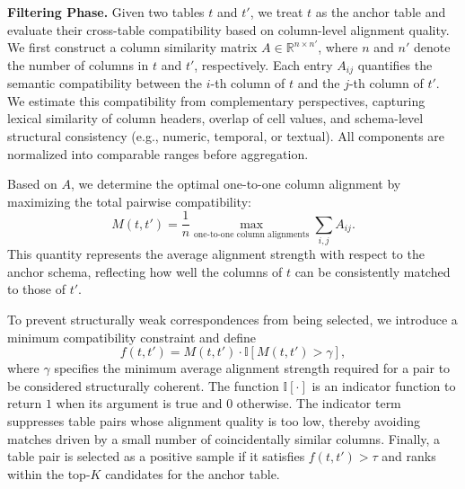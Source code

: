 \noindent\textbf{Filtering Phase.}
Given two tables $t$ and $t'$, we treat $t$ as the anchor table and evaluate their cross-table compatibility based on column-level alignment quality. 
We first construct a column similarity matrix $A\in\mathbb{R}^{n\times n'}$, where $n$ and $n'$ denote the number of columns in $t$ and $t'$, respectively. 
Each entry $A_{ij}$ quantifies the semantic compatibility between the $i$-th column of $t$ and the $j$-th column of $t'$. We estimate this compatibility from complementary perspectives, capturing lexical similarity of column headers, overlap of cell values, and schema-level structural consistency (e.g., numeric, temporal, or textual). 
All components are normalized into comparable ranges before aggregation.

Based on $A$, we determine the optimal one-to-one column alignment by maximizing the total pairwise compatibility:
\begin{equation}
\label{eq_alignment_strength}
M(t,t') =\frac{1}{n}
\max_{\text{one-to-one column alignments}}
\sum_{i,j} A_{ij}.
\end{equation}
This quantity represents the average alignment strength with respect to the anchor schema, reflecting how well the columns of $t$ can be consistently matched to those of $t'$.

To prevent structurally weak correspondences from being selected, we introduce a minimum compatibility constraint and define
\begin{equation}
\label{eq_filtering_score}
f(t,t') ={M(t,t')}
\cdot\mathbb{I}\!\left[
{M(t,t')} > \gamma
\right],
\end{equation}
where $\gamma$ specifies the minimum average alignment strength required for a pair to be considered structurally coherent. The function $\mathbb{I}[\cdot]$ is an indicator function to return $1$ when its argument is true and $0$ otherwise. 
The indicator term suppresses table pairs whose alignment quality is too low, thereby avoiding matches driven by a small number of coincidentally similar columns. Finally, a table pair is selected as a positive sample if it satisfies 
$f(t,t') > \tau$ and ranks within the top-$K$ candidates for the anchor table.

